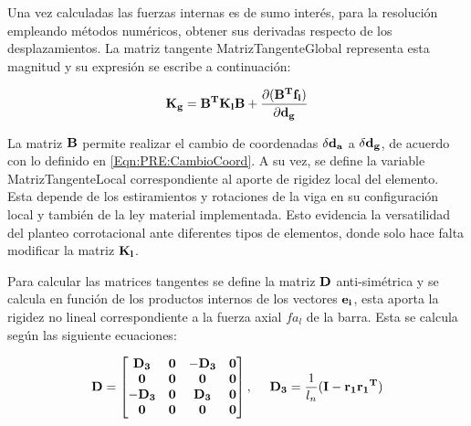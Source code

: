 Una vez calculadas las fuerzas internas es de sumo interés, para la resolución empleando métodos numéricos, obtener sus derivadas respecto de los desplazamientos. La matriz tangente \gls{MatrizTangenteGlobal} representa esta magnitud y su expresión se escribe a continuación:

\begin{equation}\label{Eqn:PRE:MatrizKest1}
\bf{K_g}=\bf{B}^T\bf{K_l}\bf{B}+\frac{\partial (\bf{B}^T\bf{f}_l)}{\partial \bf{d}_g}
\end{equation}


La matriz $\bf{B}$ permite realizar el cambio de coordenadas $\delta \bf{d_a}$ a  $\delta \bf{d_g}$, de acuerdo con lo definido en \eqref{Eqn:PRE:CambioCoord}. A su vez, se define la variable \gls{MatrizTangenteLocal} correspondiente al aporte de rigidez local del elemento. Esta depende de los estiramientos y rotaciones de la viga en su configuración local y también de la ley material implementada. Esto evidencia la versatilidad del planteo corrotacional ante diferentes tipos de elementos, donde solo hace falta modificar la matriz $\bf{K_l}$.

Para calcular las matrices tangentes se define la matriz  $\bf{D}$  anti-simétrica y se calcula en función de los productos internos de los vectores $\bf{e_i}$, esta aporta la rigidez no lineal correspondiente a la fuerza axial $fa_l$ de la barra. Esta se calcula según las siguiente ecuaciones:

\begin{equation}
	\label{Eqn:PRE:DefD}
	\bf{D}=\begin{bmatrix}
	\bf{D_3}& \bf{0}   & -\bf{D_3}   & \bf{0} \\
	\bf{0}  & \bf{0} & \bf{0}   & \bf{0}\\
	-\bf{D_3}  & \bf{0}   & \bf{D_3} & \bf{0} \\
	\bf{0}  & \bf{0}   & \bf{0}   & \bf{0}
\end{bmatrix},~~~~\bf{D_3}=\frac{\text{1}}{\text{$l_n$}}(\bf{I}-\bf{r_1}\bf{r_1}^T)
\end{equation}

